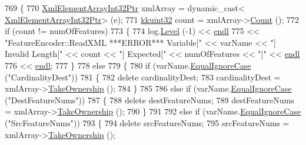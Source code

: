 \begin{DoxyCode}
769         \{
770           \hyperlink{class_k_k_b_1_1_xml_element_array_int32}{XmlElementArrayInt32Ptr} xmlArray = \textcolor{keyword}{dynamic\_cast<}
      \hyperlink{class_k_k_b_1_1_xml_element_array_int32}{XmlElementArrayInt32Ptr}\textcolor{keyword}{>} (e);
771           \hyperlink{namespace_k_k_b_af8d832f05c54994a1cce25bd5743e19a}{kkuint32} count = xmlArray->\hyperlink{class_k_k_b_1_1_xml_element_array_int32_a2773cdcb924ac8c67e32a4d07ee15f30}{Count} ();
772           \textcolor{keywordflow}{if}  (count != numOfFeatures)
773           \{
774             log.\hyperlink{class_k_k_b_1_1_run_log_a32cf761d7f2e747465fd80533fdbb659}{Level} (-1) << \hyperlink{namespace_k_k_b_ad1f50f65af6adc8fa9e6f62d007818a8}{endl}
775               << \textcolor{stringliteral}{"FeatureEncoder::ReadXML   ***ERROR***  Variable["} << varName << \textcolor{stringliteral}{"]  Invalid Length["} << 
      count << \textcolor{stringliteral}{"]  Expected["} << numOfFeatures << \textcolor{stringliteral}{"]"} << \hyperlink{namespace_k_k_b_ad1f50f65af6adc8fa9e6f62d007818a8}{endl}
776               << \hyperlink{namespace_k_k_b_ad1f50f65af6adc8fa9e6f62d007818a8}{endl};
777           \}
778           \textcolor{keywordflow}{else}
779           \{
780             \textcolor{keywordflow}{if}  (varName.\hyperlink{class_k_k_b_1_1_k_k_str_a562f9696417c53f66bc4088eac072ab5}{EqualIgnoreCase} (\textcolor{stringliteral}{"CardinalityDest"}))
781             \{
782               \textcolor{keyword}{delete}  cardinalityDest;
783               cardinalityDest = xmlArray->\hyperlink{class_k_k_b_1_1_xml_element_array_int32_a466c9f162ec1ce60a50feb8f2268b86c}{TakeOwnership} ();
784             \}
785 
786             \textcolor{keywordflow}{else} \textcolor{keywordflow}{if}  (varName.\hyperlink{class_k_k_b_1_1_k_k_str_a562f9696417c53f66bc4088eac072ab5}{EqualIgnoreCase} (\textcolor{stringliteral}{"DestFeatureNums"}))
787             \{
788               \textcolor{keyword}{delete}  destFeatureNums;
789               destFeatureNums = xmlArray->\hyperlink{class_k_k_b_1_1_xml_element_array_int32_a466c9f162ec1ce60a50feb8f2268b86c}{TakeOwnership} ();
790             \}
791 
792             \textcolor{keywordflow}{else} \textcolor{keywordflow}{if}  (varName.\hyperlink{class_k_k_b_1_1_k_k_str_a562f9696417c53f66bc4088eac072ab5}{EqualIgnoreCase} (\textcolor{stringliteral}{"SrcFeatureNums"}))
793             \{
794               \textcolor{keyword}{delete}  srcFeatureNums;
795               srcFeatureNums = xmlArray->\hyperlink{class_k_k_b_1_1_xml_element_array_int32_a466c9f162ec1ce60a50feb8f2268b86c}{TakeOwnership} ();

\end{DoxyCode}
